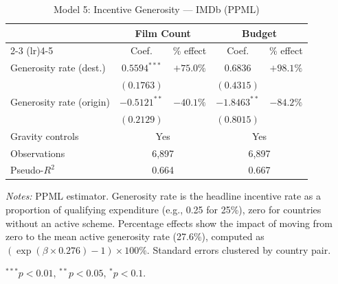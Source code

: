\clearpage


\begin{table}[htbp]
\centering
\caption{Model 5: Incentive Generosity --- IMDb (PPML)}
\label{tab:model5}
\small
\begin{tabular}{l cc cc}
\toprule
 & \multicolumn{2}{c}{Film Count} & \multicolumn{2}{c}{Budget} \\
\cmidrule(lr){2-3} \cmidrule(lr){4-5}
 & Coef. & \% effect & Coef. & \% effect \\
\midrule
Generosity rate (dest.) & $0.5594^{***}$ & $+75.0\%$ & $0.6836$ & $+98.1\%$ \\
 & $(0.1763)$ & & $(0.4315)$ & \\[4pt]
Generosity rate (origin) & $-0.5121^{**}$ & $-40.1\%$ & $-1.8463^{**}$ & $-84.2\%$ \\
 & $(0.2129)$ & & $(0.8015)$ & \\[4pt]
\midrule
Gravity controls & \multicolumn{2}{c}{Yes} & \multicolumn{2}{c}{Yes} \\
Observations & \multicolumn{2}{c}{6,897} & \multicolumn{2}{c}{6,897} \\
Pseudo-$R^2$ & \multicolumn{2}{c}{0.664} & \multicolumn{2}{c}{0.667} \\
\bottomrule
\end{tabular}
\par\vspace{4pt}\noindent\begin{minipage}{\textwidth}
\footnotesize
\par \textit{Notes:} PPML estimator. Generosity rate is the headline incentive rate as a proportion of qualifying expenditure (e.g., 0.25 for 25\%), zero for countries without an active scheme. Percentage effects show the impact of moving from zero to the mean active generosity rate (27.6\%), computed as $(\exp(\beta \times 0.276)-1) \times 100\%$. Standard errors clustered by country pair.
\par $^{***}p<0.01$, $^{**}p<0.05$, $^{*}p<0.1$.
\end{minipage}
\end{table}

\clearpage


